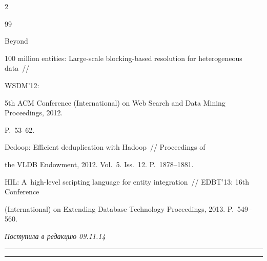 \begin{multicols}{2}
{{\begin{thebibliography}{99}

 Beyond

100 million entities: Large-scale blocking-based resolution for heterogeneous data~//

\mbox{WSDM'12}:

5th ACM Conference (International) on Web Search and Data Mining Proceedings, 2012.

P.~53--62.


 Dedoop: Efficient deduplication with Hadoop~// Proceedings of

the VLDB Endowment, 2012. Vol.~5. Iss.~12. P.~1878--1881.



HIL: A~high-level scripting language for entity integration~// EDBT'13: 16th Conference

(International) on Extending Database Technology Proceedings, 2013. P.~549--560.

 \end{thebibliography}



 }

 }



\end{multicols}



\vspace*{-6pt}



\hfill{\small\textit{Поступила в редакцию 09.11.14}}






\vspace*{10pt}



\hrule



\vspace*{2pt}



\hrule






